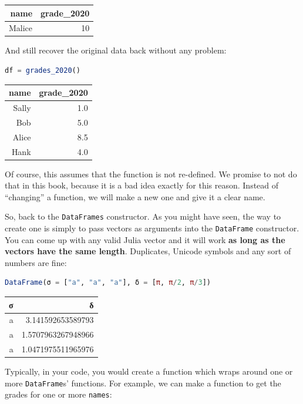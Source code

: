 \documentclass[
  notoc %
]{tufte-book}
\newcommand{\passthrough}[1]{#1}
\begin{document}
\begin{longtable}[]{@{}rr@{}}
\toprule
name & grade\_2020 \\
\midrule
\endhead
Malice & 10 \\
\bottomrule
\end{longtable}

And still recover the original data back without any problem:

\begin{lstlisting}[language=Julia]
df = grades_2020()
\end{lstlisting}

\begin{longtable}[]{@{}rr@{}}
\toprule
name & grade\_2020 \\
\midrule
\endhead
Sally & 1.0 \\
Bob & 5.0 \\
Alice & 8.5 \\
Hank & 4.0 \\
\bottomrule
\end{longtable}

Of course, this assumes that the function is not re-defined. We promise
to not do that in this book, because it is a bad idea exactly for this
reason. Instead of ``changing'' a function, we will make a new one and
give it a clear name.

So, back to the \passthrough{\lstinline!DataFrames!} constructor. As you
might have seen, the way to create one is simply to pass vectors as
arguments into the \passthrough{\lstinline!DataFrame!} constructor. You
can come up with any valid Julia vector and it will work \textbf{as long
as the vectors have the same length}. Duplicates, Unicode symbols and
any sort of numbers are fine:

\begin{lstlisting}[language=Julia]
DataFrame(σ = ["a", "a", "a"], δ = [π, π/2, π/3])
\end{lstlisting}

\begin{longtable}[]{@{}rr@{}}
\toprule
σ & δ \\
\midrule
\endhead
a & 3.141592653589793 \\
a & 1.5707963267948966 \\
a & 1.0471975511965976 \\
\bottomrule
\end{longtable}

Typically, in your code, you would create a function which wraps around
one or more \passthrough{\lstinline!DataFrame!}s' functions. For
example, we can make a function to get the grades for one or more
\passthrough{\lstinline!names!}:
\end{document}
